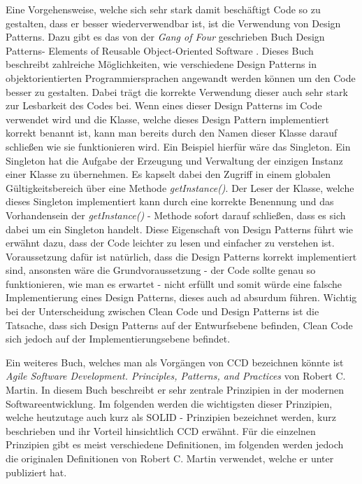 \SuperPar Eine Vorgehensweise, welche sich sehr stark damit beschäftigt Code so zu gestalten, dass er besser wiederverwendbar ist, ist die Verwendung von Design Patterns. Dazu gibt es das von der \textit{Gang of Four} geschrieben Buch Design Patterns- Elements of Reusable Object-Oriented Software \cite{Gamma1995}. Dieses Buch beschreibt zahlreiche Möglichkeiten, wie verschiedene Design Patterns in objektorientierten Programmiersprachen angewandt werden können um den Code besser zu gestalten. Dabei trägt die korrekte Verwendung dieser auch sehr stark zur Lesbarkeit des Codes bei. Wenn eines dieser Design Patterns im Code verwendet wird und die Klasse, welche dieses Design Pattern implementiert korrekt benannt ist, kann man bereits durch den Namen dieser Klasse darauf schließen wie sie funktionieren wird. Ein Beispiel hierfür wäre das Singleton. Ein Singleton hat die Aufgabe der Erzeugung und Verwaltung der einzigen Instanz einer Klasse zu übernehmen. Es kapselt dabei den Zugriff in einem globalen Gültigkeitsbereich über eine Methode \textit{getInstance()}. Der Leser der Klasse, welche dieses Singleton implementiert kann durch eine korrekte Benennung und das Vorhandensein der \textit{getInstance()} - Methode sofort darauf schließen, dass es sich dabei um ein Singleton handelt. Diese Eigenschaft von Design Patterns führt wie erwähnt dazu, dass der Code leichter zu lesen und einfacher zu verstehen ist. Voraussetzung dafür ist natürlich, dass die Design Patterns korrekt implementiert sind, ansonsten wäre die Grundvoraussetzung - der Code sollte genau so funktionieren, wie man es erwartet - nicht erfüllt und somit würde eine falsche Implementierung eines Design Patterns, dieses auch ad absurdum führen. Wichtig bei der Unterscheidung zwischen Clean Code und Design Patterns ist die Tatsache, dass sich Design Patterns auf der Entwurfsebene befinden, Clean Code sich jedoch auf der Implementierungsebene befindet.

\SuperPar Ein weiteres Buch, welches man als Vorgängen von CCD bezeichnen könnte ist \textit{Agile Software Development. Principles, Patterns, and Practices} \cite{Martin2002} von Robert C. Martin. In diesem Buch beschreibt er sehr zentrale Prinzipien in der modernen Softwareentwicklung. Im folgenden werden die wichtigsten dieser Prinzipien, welche heutzutage auch kurz als SOLID - Prinzipien bezeichnet werden, kurz beschrieben und ihr Vorteil hinsichtlich CCD erwähnt. Für die einzelnen Prinzipien gibt es meist verschiedene Definitionen, im folgenden werden jedoch die originalen Definitionen von Robert C. Martin verwendet, welche er unter \cite{Martin2016} publiziert hat. 

